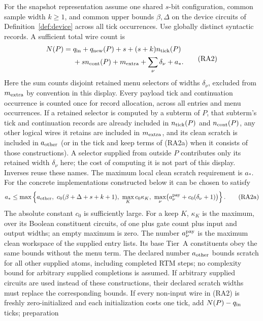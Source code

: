 \begin{theorem}
For the snapshot representation assume one shared $s$-bit configuration,
common sample width $k\geq1$, and common upper bounds $\beta,\Delta$
on the device circuits of Definition~\ref{def:device} across all tick
occurrences. Use globally distinct syntactic records. A sufficient
total wire count is
\[
 \begin{split}
 N(P)={}&q_{\rm in}+q_{\rm new}(P)+s+(s+k)n_{\rm tick}(P)\\
       &{}+s n_{\rm cont}(P)+m_{\rm extra}
         +\sum_\nu\delta_\nu+a_* .
 \end{split}                                         \tag{RA2}
\]
Here the sum counts disjoint retained menu selectors of widths
$\delta_\nu$, excluded from $m_{\rm extra}$ by convention in this
display. Every payload tick and continuation occurrence is counted once
for record allocation, across all entries and menu occurrences. If a retained
selector is computed by a subterm of $P$, that subterm's tick and continuation
records are already included in $n_{\rm tick}(P)$ and $n_{\rm cont}(P)$,
any other logical wires it retains are included in $m_{\rm extra}$,
and its clean scratch is included in $a_{\rm other}$ (or in the tick
and keep terms of (RA2a) when it consists of those constructions).
A selector supplied from outside $P$ contributes only its retained width
$\delta_\nu$ here; the cost of computing it is not part of this display. Inverses reuse these names.
The maximum local clean scratch requirement is $a_*$. For the concrete
implementations constructed below it can be chosen to satisfy
\[
 a_*\leq\max\left\{
 a_{\rm other},\ c_0(\beta+\Delta+s+k+1),\
 \max_K c_0\kappa_K,\
 \max_\nu\bigl(a_\nu^{\rm pay}+c_0(\delta_\nu+1)\bigr)
 \right\}.                                         \tag{RA2a}
\]
The absolute constant $c_0$ is sufficiently large. For a keep $K$,
$\kappa_K$ is the maximum, over its Boolean constituent circuits, of
one plus gate count plus input and output widths; an empty maximum
is zero. The number $a_\nu^{\rm pay}$ is the maximum clean workspace
of the supplied entry lists. Its base Tier~A constituents obey the
same bounds without the menu term. The declared number $a_{\rm other}$
bounds scratch for all other supplied atoms, including completed RTM
steps; no complexity bound for arbitrary supplied completions is assumed.
If arbitrary supplied circuits are used instead of these constructions,
their declared scratch widths must replace the corresponding bounds.
If every non-input wire in (RA2) is freshly zero-initialized and each
initialization costs one tick, add $N(P)-q_{\rm in}$ ticks; preparation

\end{theorem}
